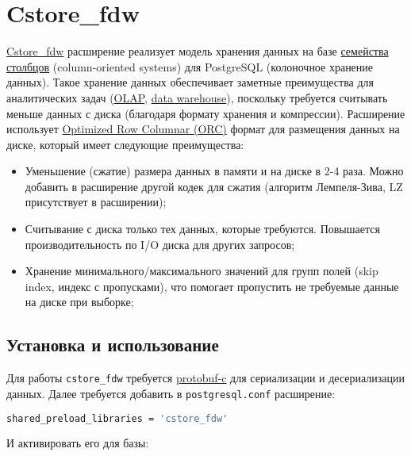 \section{Cstore\_fdw}

\href{https://citusdata.github.io/cstore\_fdw/}{Cstore\_fdw} расширение реализует модель хранения данных на базе \href{https://en.wikipedia.org/wiki/Column-oriented\_DBMS}{семейства столбцов} (column-oriented systems) для PostgreSQL (колоночное хранение данных). Такое хранение данных обеспечивает заметные преимущества для аналитических задач (\href{https://ru.wikipedia.org/wiki/OLAP}{OLAP}, \href{https://en.wikipedia.org/wiki/Data\_warehouse}{data warehouse}), поскольку требуется считывать меньше данных с диска (благодаря формату хранения и компрессии). Расширение использует \href{https://cwiki.apache.org/confluence/display/Hive/LanguageManual+ORC#LanguageManualORC-ORCFileFormat}{Optimized Row Columnar (ORC)} формат для размещения данных на диске, который имеет следующие преимущества:

\begin{itemize}
  \item Уменьшение (сжатие) размера данных в памяти и на диске в 2-4 раза. Можно добавить в расширение другой кодек для сжатия (алгоритм Лемпеля-Зива, LZ присутствует в расширении);
  \item Считывание с диска только тех данных, которые требуются. Повышается производительность по I/O диска для других запросов;
  \item Хранение минимального/максимального значений для групп полей (skip index, индекс с пропусками), что помогает пропустить не требуемые данные на диске при выборке;
\end{itemize}


\subsection{Установка и использование}

Для работы \lstinline!cstore_fdw! требуется \href{https://github.com/protobuf-c/protobuf-c}{protobuf-c} для сериализации и десериализации данных. Далее требуется добавить в \lstinline!postgresql.conf! расширение:

\begin{lstlisting}[language=Bash,label=lst:cstore1,caption=Cstore\_fdw]
shared_preload_libraries = 'cstore_fdw'
\end{lstlisting}

И активировать его для базы:

